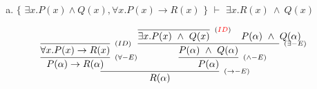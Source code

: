 \documentclass[aspectratio=43]{beamer}
\begin{document}
    \begin{frame}[fragile]
    
    	\begin{enumerate}[d)]
			\item $\{$ $\exists x.P(x)\land Q(x), \forall x.P(x)\to R(x)$ $\}$ $\vdash$ $\exists x.R(x)\ \land\ Q(x) $\\
		\end{enumerate}
        
        \vspace{65pt}
        
        \[
        \begin{array}{c}
		
        	\infer[_{(\to -E)}]
            	{R(\alpha)}
            	{\infer[_{(\forall -E)}]
                	{P(\alpha) \rightarrow R(\alpha)} 
                    {\infer[_{(ID)}]
                    	{\forall x.P(x)\to R(x)}
                    	{}
                    }  
            	\infer[_{(\land -E)}] 
                	{P(\alpha)}
                    {\infer[_{(\exists -E)}]
                    	{P(\alpha)\ \land \ Q(\alpha)}
                    	{\infer[_{(\textcolor{red}{ID})}]
                        	{\exists x.P(x)\ \land \ Q(x)}
                            {}
                        \hspace{10pt}
                        P(\alpha)\ \land \ Q(\alpha)
                        }
                    }
                }
		\end{array}
        \]
        
	\end{frame}
    
\end{document}
